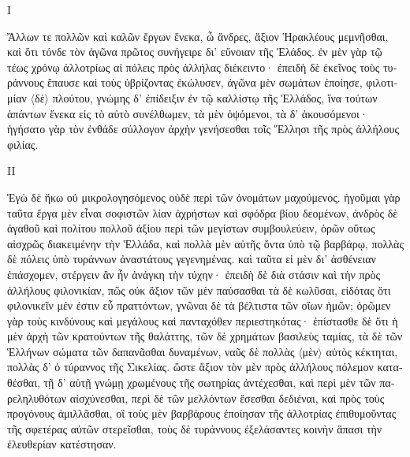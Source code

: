 
\medskip


{\large
{ \noindent I

\begin{greek}

\noindent Ἄλλων τε πολλῶν καὶ καλῶν ἔργων ἕνεκα, ὦ ἄνδρες, ἄξιον Ἡρακλέους μεμνῆσθαι, καὶ ὅτι τόνδε τὸν ἀγῶνα πρῶτος συνήγειρε δι' εὔνοιαν τῆς Ἑλάδος. ἐν μὲν γὰρ τῷ τέως χρόνῳ ἀλλοτρίως αἱ πόλεις πρὸς ἀλλήλας διέκειντο· ἐπειδὴ δὲ ἐκεῖνος τοὺς τυράννους ἔπαυσε καὶ τοὺς ὑβρίζοντας ἐκώλυσεν, ἀγῶνα μὲν σωμάτων ἐποίησε, φιλοτιμίαν $\langle$δὲ$\rangle$ πλούτου, γνώμης δ' ἐπίδειξιν ἐν τῷ καλλίστῳ τῆς Ἑλλάδος, ἵνα τούτων ἁπάντων ἕνεκα εἰς τὸ αὐτὸ συνέλθωμεν, τὰ μὲν ὀψόμενοι, τὰ δ' ἀκουσόμενοι· ἡγήσατο γὰρ τὸν ἐνθάδε σύλλογον ἀρχὴν γενήσεσθαι τοῖς  Ἕλλησι τῆς πρὸς ἀλλήλους φιλίας. 

\end{greek}

\noindent II

\begin{greek}

\noindent  Ἐγὼ δὲ ἥκω οὐ μικρολογησόμενος οὐδὲ περὶ τῶν ὀνομάτων μαχούμενος. ἡγοῦμαι γὰρ ταῦτα ἔργα μὲν εἶναι σοφιστῶν λίαν ἀχρήστων καὶ σφόδρα βίου δεομένων, ἀνδρὸς δὲ ἀγαθοῦ καὶ πολίτου πολλοῦ ἀξίου περὶ τῶν μεγίστων συμβουλεύειν, ὁρῶν οὕτως αἰσχρῶς διακειμένην τὴν Ἑλλάδα, καὶ πολλὰ μὲν αὐτῆς ὄντα ὑπὸ τῷ βαρβάρῳ, πολλὰς δὲ πόλεις ὑπὸ τυράννων ἀναστάτους γεγενημένας. καὶ ταῦτα εἰ μὲν δι' ἀσθένειαν ἐπάσχομεν, στέργειν ἂν ἦν ἀνάγκη τὴν τύχην· ἐπειδὴ δὲ διὰ στάσιν καὶ τὴν πρὸς ἀλλήλους φιλονικίαν, πῶς οὐκ ἄξιον τῶν μὲν παύσασθαι τὰ δὲ κωλῦσαι, εἰδότας ὅτι φιλονικεῖν μέν ἐστιν εὖ πραττόντων, γνῶναι δὲ τὰ βέλτιστα τῶν οἵων ἡμῶν; ὁρῶμεν γὰρ τοὺς κινδύνους καὶ μεγάλους καὶ πανταχόθεν περιεστηκότας· ἐπίστασθε δὲ ὅτι ἡ μὲν ἀρχὴ τῶν κρατούντων τῆς θαλάττης, τῶν δὲ χρημάτων βασιλεὺς ταμίας, τὰ δὲ τῶν Ἑλλήνων σώματα τῶν δαπανᾶσθαι δυναμένων, ναῦς δὲ πολλὰς $\langle$μὲν$\rangle$ αὐτὸς κέκτηται, πολλὰς δ' ὁ τύραννος τῆς Σικελίας. ὥστε ἄξιον τὸν μὲν πρὸς ἀλλήλους πόλεμον καταθέσθαι, τῇ δ' αὐτῇ γνώμῃ χρωμένους τῆς σωτηρίας ἀντέχεσθαι, καὶ περὶ μὲν τῶν παρεληλυθότων αἰσχύνεσθαι, περὶ δὲ τῶν μελλόντων ἔσεσθαι δεδιέναι, καὶ πρὸς τοὺς προγόνους ἁμιλλᾶσθαι, οἳ τοὺς μὲν βαρβάρους ἐποίησαν τῆς ἀλλοτρίας ἐπιθυμοῦντας τῆς σφετέρας αὐτῶν στερεῖσθαι, τοὺς δὲ τυράννους ἐξελάσαντες κοινὴν ἅπασι τὴν ἐλευθερίαν κατέστησαν.
\end{greek}

}
}

